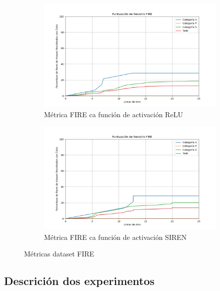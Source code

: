 \begin{figure}[tbp]
    \centering
    \begin{subfigure}[b]{0.5\textwidth}
        \centering
        \includegraphics[width=\textwidth]{imaxes/FIRE_scores/fire_registration_score_ReLU.png}
        \caption{Métrica FIRE ca función de activación ReLU}
        \label{fig:FIRE_relu}
    \end{subfigure}\hfill
    \begin{subfigure}[b]{0.5\textwidth}
        \centering
        \includegraphics[width=\textwidth]{imaxes/FIRE_scores/fire_registration_scores_SIREN.png}
        \caption{Métrica FIRE ca función de activación SIREN}
        \label{fig:FIRE_SIREN}
    \end{subfigure}
    \caption{Métricas dataset FIRE}
    \label{fig:FIRE_scores}
\end{figure}

\subsection{Descrición dos experimentos}
\label{subsec:Descrición dos experimentos}

